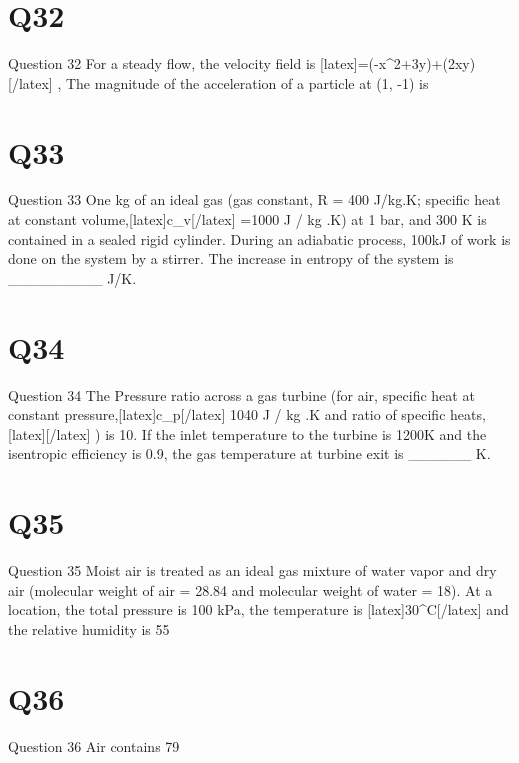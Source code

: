 \section*{Q32}
Question 32 For a steady flow, the velocity field is [latex]=(-x^{2}+3y)+(2xy)[/latex] , The magnitude of the acceleration of a particle at (1, -1) is

\section*{Q33}
Question 33 One kg of an ideal gas (gas constant, R = 400 J/kg.K; specific heat at constant volume,[latex]c\_{\textrm{v}}[/latex] =1000 J / kg .K) at 1 bar, and 300 K is contained in a sealed rigid cylinder. During an adiabatic process, 100kJ of work is done on the system by a stirrer. The increase in entropy of the system is \_\_\_\_\_\_\_\_\_ J/K.

\section*{Q34}
Question 34 The Pressure ratio across a gas turbine (for air, specific heat at constant pressure,[latex]c\_{\textrm{p}}[/latex] 1040 J / kg .K and ratio of specific heats, [latex][/latex]  ) is 10. If the inlet temperature to the turbine is 1200K and the isentropic efficiency is 0.9, the gas temperature at turbine exit is \_\_\_\_\_\_ K.

\section*{Q35}
Question 35 Moist air is treated as an ideal gas mixture of water vapor and dry air (molecular weight of air = 28.84 and molecular weight of water = 18). At a location, the total pressure is 100 kPa, the temperature is [latex]30^{\circ}C[/latex]  and the relative humidity is 55%

\section*{Q36}
Question 36 Air contains 79%

